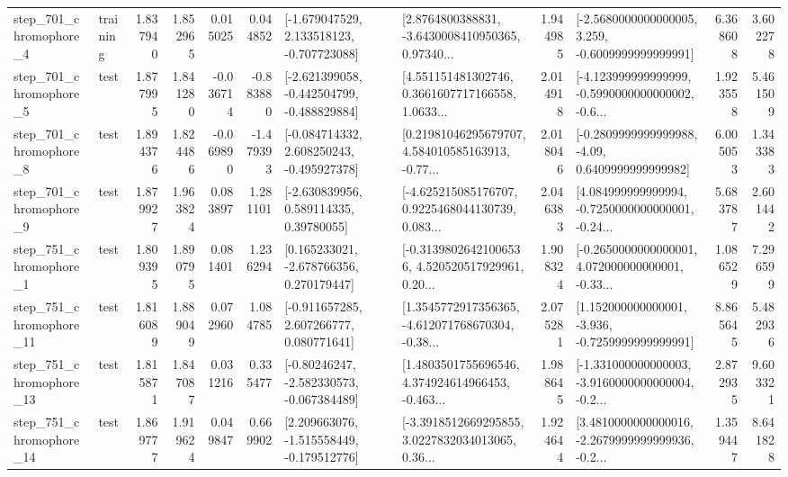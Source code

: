 \begin{tabular}{llrrrrllrlrr}
   step\_701\_chromophore\_4 &  training &      1.837940 &    1.852965 &      0.015025 &  0.044852 &   [-1.679047529, 2.133518123, -0.707723088] &  [2.8764800388831, -3.6430008410950365, 0.97340... &       1.944985 &  [-2.5680000000000005, 3.259, -0.6009999999999991] &            6.368608 &          3.602278 \\
   step\_701\_chromophore\_5 &      test &      1.877995 &    1.841280 &     -0.036714 & -0.883880 &  [-2.621399058, -0.442504799, -0.488829884] &  [4.551151481302746, 0.3661607717166558, 1.0633... &       2.014918 &  [-4.123999999999999, -0.5990000000000002, -0.6... &            1.923558 &          5.461509 \\
   step\_701\_chromophore\_8 &      test &      1.894376 &    1.824486 &     -0.069890 & -1.479393 &   [-0.084714332, 2.608250243, -0.495927378] &  [0.21981046295679707, 4.584010585163913, -0.77... &       2.018046 &   [-0.2809999999999988, -4.09, 0.6409999999999982] &            6.005053 &          1.343383 \\
   step\_701\_chromophore\_9 &      test &      1.879927 &    1.963824 &      0.083897 &  1.281101 &     [-2.630839956, 0.589114335, 0.39780055] &  [-4.625215085176707, 0.9225468044130739, 0.083... &       2.046383 &  [4.084999999999994, -0.7250000000000001, -0.24... &            5.683787 &          2.601442 \\
   step\_751\_chromophore\_1 &      test &      1.809395 &    1.890795 &      0.081401 &  1.236294 &    [0.165233021, -2.678766356, 0.270179447] &  [-0.31398026421006536, 4.520520517929961, 0.20... &       1.908324 &  [-0.2650000000000001, 4.072000000000001, -0.33... &            1.086529 &          7.296599 \\
  step\_751\_chromophore\_11 &      test &      1.816089 &    1.889049 &      0.072960 &  1.084785 &    [-0.911657285, 2.607266777, 0.080771641] &  [1.3545772917356365, -4.612071768670304, -0.38... &       2.075281 &   [1.152000000000001, -3.936, -0.7259999999999991] &            8.865645 &          5.482936 \\
  step\_751\_chromophore\_13 &      test &      1.815871 &    1.847087 &      0.031216 &  0.335477 &   [-0.80246247, -2.582330573, -0.067384489] &  [1.4803501755696546, 4.374924614966453, -0.463... &       1.988645 &  [-1.331000000000003, -3.9160000000000004, -0.2... &            2.872935 &          9.603321 \\
  step\_751\_chromophore\_14 &      test &      1.869777 &    1.919624 &      0.049847 &  0.669902 &   [2.209663076, -1.515558449, -0.179512776] &  [-3.3918512669295855, 3.0227832034013065, 0.36... &       1.924644 &  [3.4810000000000016, -2.2679999999999936, -0.2... &            1.359447 &          8.641828 \\

\end{tabular}
